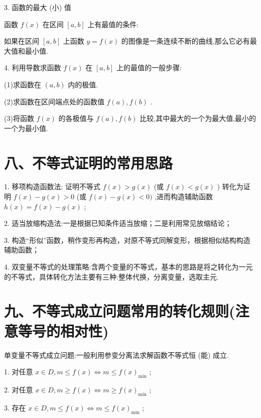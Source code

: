 3. 函数的最大 (小) 值

函数 $f\left( x\right)$ 在区间 $\left\lbrack  {a,b}\right\rbrack$ 上有最值的条件:

如果在区间 $\left\lbrack  {a,b}\right\rbrack$ 上函数 $y = f\left( x\right)$ 的图像是一条连续不断的曲线,那么它必有最大值和最小值.

4. 利用导数求函数 $f\left( x\right)$ 在 $\left\lbrack  {a,b}\right\rbrack$ 上的最值的一般步骤:

(1)求函数在 $\left( {a,b}\right)$ 内的极值.

(2)求函数在区间端点处的函数值 $f\left( a\right) ,f\left( b\right)$ .

(3)将函数 $f\left( x\right)$ 的各极值与 $f\left( a\right) ,f\left( b\right)$ 比较,其中最大的一个为最大值,最小的一个为最小值.

\section*{八、不等式证明的常用思路}

1. 移项构造函数法: 证明不等式 $f\left( x\right)  > g\left( x\right)$ (或 $f\left( x\right)  < g\left( x\right)$ ) 转化为证明 $f\left( x\right)  - g\left( x\right)  > 0$ (或 $f\left( x\right)  - g\left( x\right)  < 0)$ ,进而构造辅助函数 $h\left( x\right)  = f\left( x\right)  - g\left( x\right)$ ;

2. 适当放缩构造法:一是根据已知条件适当放缩；二是利用常见放缩结论；

3. 构造“形似”函数，稍作变形再构造，对原不等式同解变形，根据相似结构构造辅助函数；

4. 双变量不等式的处理策略:含两个变量的不等式，基本的思路是将之转化为一元的不等式，具体转化方法主要有三种:整体代换，分离变量，选取主元.

\section*{九、不等式成立问题常用的转化规则(注意等号的相对性)}

单变量不等式成立问题:一般利用参变分离法求解函数不等式恒 (能) 成立.

1. 对任意 $x \in  D,m \leq  f\left( x\right)  \Leftrightarrow  m \leq  f{\left( x\right) }_{\min }$ ;

2. 对任意 $x \in  D,m \geq  f\left( x\right)  \Leftrightarrow  m \geq  f{\left( x\right) }_{\min }$ ;

3. 存在 $x \in  D,m \leq  f\left( x\right)  \Leftrightarrow  m \leq  f{\left( x\right) }_{\min }$ ;

